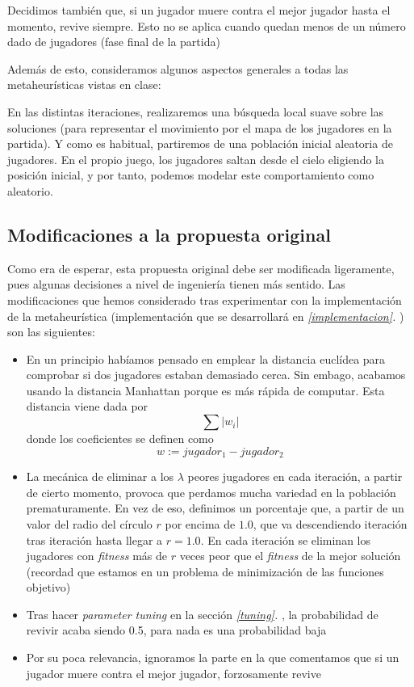 \documentclass[11pt]{article}
\begin{document}
Decidimos también que, si un jugador muere contra el mejor jugador hasta el momento, revive siempre. Esto no se aplica cuando quedan menos de un número dado de jugadores (fase final de la partida)

Además de esto, consideramos algunos aspectos generales a todas las metaheurísticas vistas en clase:

En las distintas iteraciones, realizaremos una búsqueda local suave sobre las soluciones (para representar el movimiento por el mapa de los jugadores en la partida). Y como es habitual, partiremos de una población inicial aleatoria de jugadores. En el propio juego, los jugadores saltan desde el cielo eligiendo la posición inicial, y por tanto, podemos modelar este comportamiento como aleatorio.

\subsection{Modificaciones a la propuesta original}

Como era de esperar, esta propuesta original debe ser modificada ligeramente, pues algunas decisiones a nivel de ingeniería tienen más sentido. Las modificaciones que hemos considerado tras experimentar con la implementación de la metaheurística (implementación que se desarrollará en \emph{\ref{implementacion}. }) son las siguientes:

\begin{itemize}
    \item En un principio habíamos pensado en emplear la distancia euclídea para comprobar si dos jugadores estaban demasiado cerca. Sin embago, acabamos usando la distancia Manhattan porque es más rápida de computar. Esta distancia viene dada por $$\sum |w_i|$$ donde los coeficientes se definen como $$w := jugador_1 - jugador_2$$
    \item La mecánica de eliminar a los $\lambda$ peores jugadores en cada iteración, a partir de cierto momento, provoca que perdamos mucha variedad en la población prematuramente. En vez de eso, definimos un porcentaje que, a partir de un valor del radio del círculo $r$ por encima de $1.0$, que va descendiendo iteración tras iteración hasta llegar a $r = 1.0$. En cada iteración se eliminan los jugadores con \emph{fitness} más de $r$ veces peor que el \emph{fitness} de la mejor solución (recordad que estamos en un problema de minimización de las funciones objetivo)
    \item Tras hacer \emph{parameter tuning} en la sección \emph{\ref{tuning}. }, la probabilidad de revivir acaba siendo 0.5, para nada es una probabilidad baja
    \item Por su poca relevancia, ignoramos la parte en la que comentamos que si un jugador muere contra el mejor jugador, forzosamente revive
\end{itemize}
\end{document}
